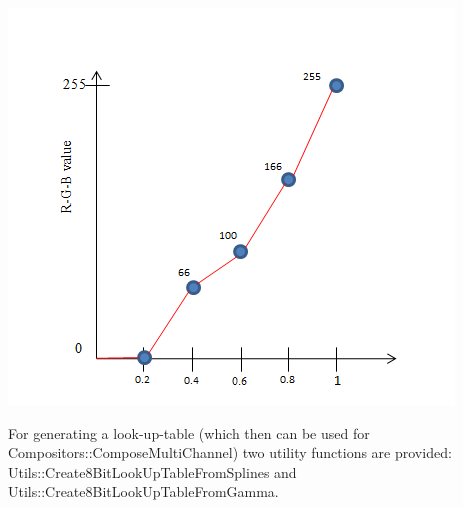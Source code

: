 \begin{DoxyImage}
\includegraphics[width=\textwidth,height=\textheight/2,keepaspectratio=true]{gradationcurve_2.PNG}
\end{DoxyImage}
 For generating a look-\/up-\/table (which then can be used for Compositors\+::\+Compose\+Multi\+Channel) two utility functions are provided\+: Utils\+::\+Create8\+Bit\+Look\+Up\+Table\+From\+Splines and Utils\+::\+Create8\+Bit\+Look\+Up\+Table\+From\+Gamma. 